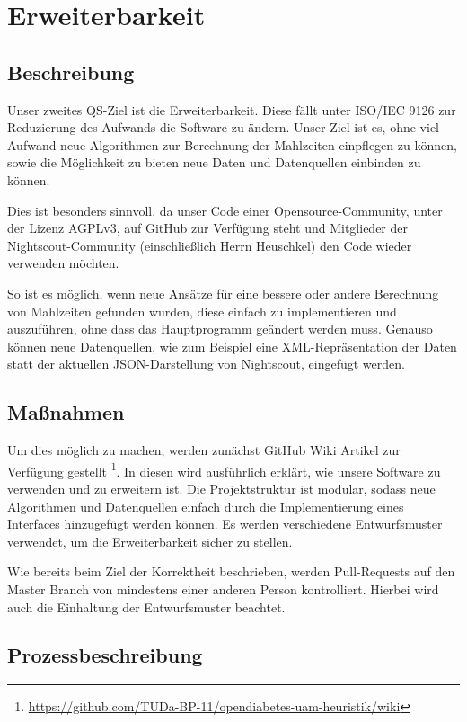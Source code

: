 \documentclass[accentcolor=tud0b,12pt,paper=a4]{tudreport}
\begin{document}
\newpage

\section{Erweiterbarkeit}

\subsection{Beschreibung}

Unser zweites QS-Ziel ist die Erweiterbarkeit. Diese fällt unter ISO/IEC 9126 zur Reduzierung des Aufwands die Software zu ändern. Unser Ziel ist es, ohne viel Aufwand neue Algorithmen zur Berechnung der Mahlzeiten einpflegen zu können, sowie die Möglichkeit zu bieten neue Daten und Datenquellen einbinden zu können.

Dies ist besonders sinnvoll, da unser Code einer Opensource-Community, unter der Lizenz \mbox{AGPLv3}, auf GitHub zur Verfügung steht und Mitglieder der Nightscout-Community (einschließlich Herrn Heuschkel) den Code wieder verwenden möchten.

So ist es möglich, wenn neue Ansätze für eine bessere oder andere Berechnung von Mahlzeiten gefunden wurden, diese einfach zu implementieren und auszuführen, ohne dass das Hauptprogramm geändert werden muss. Genauso können neue Datenquellen, wie zum Beispiel eine XML-Repräsentation der Daten statt der aktuellen JSON-Darstellung von Nightscout, eingefügt werden.

\subsection{Maßnahmen}

Um dies möglich zu machen, werden zunächst GitHub Wiki Artikel zur Verfügung gestellt \footnote{\url{https://github.com/TUDa-BP-11/opendiabetes-uam-heuristik/wiki}}. In diesen wird ausführlich erklärt, wie unsere Software zu verwenden und zu erweitern ist. Die Projektstruktur ist modular, sodass neue Algorithmen und Datenquellen einfach durch die Implementierung eines Interfaces hinzugefügt werden können. Es werden verschiedene Entwurfsmuster verwendet, um die Erweiterbarkeit sicher zu stellen.

Wie bereits beim Ziel der Korrektheit beschrieben, werden Pull-Requests auf den Master Branch von mindestens einer anderen Person kontrolliert. Hierbei wird auch die Einhaltung der Entwurfsmuster beachtet.

\subsection{Prozessbeschreibung}
\end{document}
